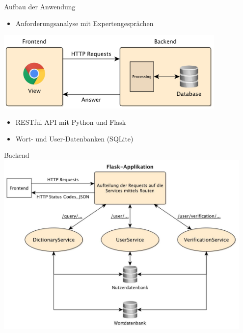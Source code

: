 \documentclass{beamer}
\begin{document}
\begin{frame}{Aufbau der Anwendung}
	\begin{itemize}
		\item Anforderungsanalyse mit Expertengesprächen
	\end{itemize}

	\centering
	\includegraphics[width=0.85\textwidth]{../figures/frontendbackend}\\
	
	\begin{itemize}
		\item RESTful API mit Python und Flask
		\item Wort- und User-Datenbanken (SQLite)
	\end{itemize}
\end{frame}

\begin{frame}{Backend}
	\centering
	\includegraphics[width=0.95\textwidth]{../figures/backend}
\end{frame}
\end{document}
